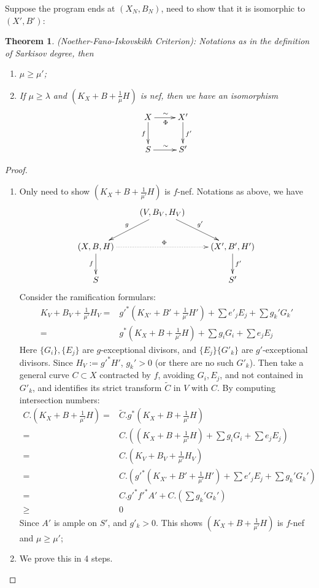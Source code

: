 \documentclass{article}
\newtheorem{thm}[defn]{Theorem}
\begin{document}
Suppose the program ends at $ (X_N,B_N) $, need to show that it is isomorphic to $ (X',B') $:
\begin{thm}\label{nfi}
(Noether-Fano-Iskovskikh Criterion): Notations as in the definition of Sarkisov degree, then
\begin{enumerate}
\item $ \mu\geqslant \mu' $;
\item If $ \mu \geqslant \lambda $ and $ (K_X+B+\frac{1}{\mu} H) $ is nef, then we have an isomorphism
$$ \xymatrix{
X\ar[r]^\sim_\Phi\ar[d]_f&X'\ar[d]^{f'}\\
S\ar[r]^\sim& S' } $$
\end{enumerate}
\end{thm}
\begin{proof}
\begin{enumerate}
\item Only need to show $ (K_X+B+\frac{1}{\mu'}H) $ is $ f $-nef. Notations as above, we have
$$ \xymatrix{
&(V,B_V,H_V)\ar[dl]_g\ar[dr]^{g'}&\\
(X,B,H)\ar[d]_f\ar@{.>}[rr]^\Phi&&(X',B',H')\ar[d]^{f'}\\
S&&S'} $$
Consider the ramification formulars:
\begin{equation}
\begin{aligned}
K_V+B_V+\frac{1}{\mu'}H_V=&g'^*(K_{X'}+B'+\frac{1}{\mu'}H')+\sum e'_jE_j+ \sum g_k'G_k'\\
=&g^*(K_{X}+B+\frac{1}{\mu'}H)+\sum g_iG_i+\sum e_jE_j
\end{aligned}
\end{equation}
Here $ \{G_i\}, \{E_j\} $ are $ g $-exceptional divisors, and $ \{E_j\}\{G'_k\} $ are $ g' $-exceptional divisors. Since $H_V:=g'^*H' $, $ g_k'>0 $ (or there are no such $ G'_k $). Then take a general curve $ C\subset X $ contracted by $ f $,  avoiding $ G_i, E_j $, and not contained in $ G'_k $, and identifies its strict transform $ \tilde{C} $ in $ V $ with $ C $. By computing intersection numbers:
\begin{equation*}
\begin{aligned}
C.(K_X+B+\frac{1}{\mu'}H)=&\tilde{C}.g^*(K_X+B+\frac{1}{\mu'}H)
\\=&C.((K_X+B+\frac{1}{\mu'}H)+\sum g_iG_i+\sum e_jE_j)\\
=&C.(K_V+B_V+\frac{1}{\mu'}H_V)\\
=&C.(g'^*(K_{X'}+B'+\frac{1}{\mu'}H')+\sum e'_jE_j+ \sum g_k'G_k')\\
=&C.g'^*f'^*A'+C.(\sum g_k'G_k')\\
\geqslant&0
\end{aligned}
\end{equation*}
Since $ A' $ is ample on $ S' $, and $ g'_k>0 $. This shows $ (K_X+B+\frac{1}{\mu'}H) $ is $ f $-nef and $ \mu\geqslant \mu' $;
\item We prove this in 4 steps.


\end{enumerate}
\end{proof}
\end{document}
